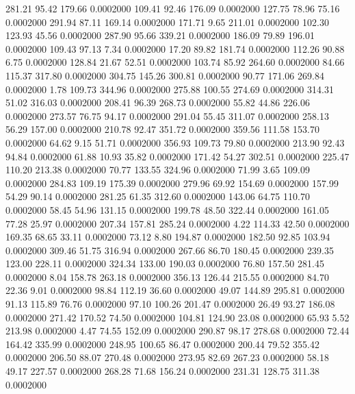  281.21   95.42  179.66   0.0002000
 109.41   92.46  176.09   0.0002000
 127.75   78.96   75.16   0.0002000
 291.94   87.11  169.14   0.0002000
 171.71    9.65  211.01   0.0002000
 102.30  123.93   45.56   0.0002000
 287.90   95.66  339.21   0.0002000
 186.09   79.89  196.01   0.0002000
 109.43   97.13    7.34   0.0002000
  17.20   89.82  181.74   0.0002000
 112.26   90.88    6.75   0.0002000
 128.84   21.67   52.51   0.0002000
 103.74   85.92  264.60   0.0002000
  84.66  115.37  317.80   0.0002000
 304.75  145.26  300.81   0.0002000
  90.77  171.06  269.84   0.0002000
   1.78  109.73  344.96   0.0002000
 275.88  100.55  274.69   0.0002000
 314.31   51.02  316.03   0.0002000
 208.41   96.39  268.73   0.0002000
  55.82   44.86  226.06   0.0002000
 273.57   76.75   94.17   0.0002000
 291.04   55.45  311.07   0.0002000
 258.13   56.29  157.00   0.0002000
 210.78   92.47  351.72   0.0002000
 359.56  111.58  153.70   0.0002000
  64.62    9.15   51.71   0.0002000
 356.93  109.73   79.80   0.0002000
 213.90   92.43   94.84   0.0002000
  61.88   10.93   35.82   0.0002000
 171.42   54.27  302.51   0.0002000
 225.47  110.20  213.38   0.0002000
  70.77  133.55  324.96   0.0002000
  71.99    3.65  109.09   0.0002000
 284.83  109.19  175.39   0.0002000
 279.96   69.92  154.69   0.0002000
 157.99   54.29   90.14   0.0002000
 281.25   61.35  312.60   0.0002000
 143.06   64.75  110.70   0.0002000
  58.45   54.96  131.15   0.0002000
 199.78   48.50  322.44   0.0002000
 161.05   77.28   25.97   0.0002000
 207.34  157.81  285.24   0.0002000
   4.22  114.33   42.50   0.0002000
 169.35   68.65   33.11   0.0002000
  73.12    8.80  194.87   0.0002000
 182.50   92.85  103.94   0.0002000
 309.46   51.75  316.94   0.0002000
 267.66   86.70  180.45   0.0002000
 239.35  123.00  228.11   0.0002000
 324.34  133.00  190.03   0.0002000
  76.80  157.50  281.45   0.0002000
   8.04  158.78  263.18   0.0002000
 356.13  126.44  215.55   0.0002000
  84.70   22.36    9.01   0.0002000
  98.84  112.19   36.60   0.0002000
  49.07  144.89  295.81   0.0002000
  91.13  115.89   76.76   0.0002000
  97.10  100.26  201.47   0.0002000
  26.49   93.27  186.08   0.0002000
 271.42  170.52   74.50   0.0002000
 104.81  124.90   23.08   0.0002000
  65.93    5.52  213.98   0.0002000
   4.47   74.55  152.09   0.0002000
 290.87   98.17  278.68   0.0002000
  72.44  164.42  335.99   0.0002000
 248.95  100.65   86.47   0.0002000
 200.44   79.52  355.42   0.0002000
 206.50   88.07  270.48   0.0002000
 273.95   82.69  267.23   0.0002000
  58.18   49.17  227.57   0.0002000
 268.28   71.68  156.24   0.0002000
 231.31  128.75  311.38   0.0002000
